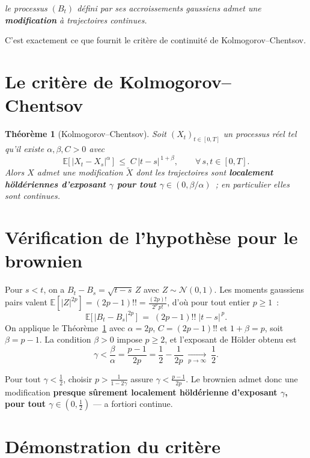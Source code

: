 \documentclass[11pt,a4paper]{article}
\theoremstyle{plain}
\newtheorem{theoreme}{Théorème}
\theoremstyle{definition}
\newcommand{\Esp}{\mathbb{E}}
\newcommand{\Loi}{\mathcal{N}}
\newcommand{\abs}[1]{\left\lvert #1 \right\rvert}
\begin{document}
\begin{center}
\itshape le processus $(B_t)$ d\'efini par ses accroissements gaussiens admet une \textbf{modification} \`a trajectoires continues.
\end{center}

C'est exactement ce que fournit le crit\`ere de continuit\'e de Kolmogorov--Chentsov.

\section{Le crit\`ere de Kolmogorov--Chentsov}

\begin{theoreme}[Kolmogorov--Chentsov]\label{th:kc}
Soit $(X_t)_{t\in[0,T]}$ un processus r\'eel tel qu'il existe $\alpha,\beta,C>0$ avec
\[
\Esp\bigl[\,\abs{X_t-X_s}^{\alpha}\,\bigr]\;\le\;C\,\abs{t-s}^{\,1+\beta},\qquad\forall\,s,t\in[0,T].
\]
Alors $X$ admet une modification $\tilde X$ dont les trajectoires sont \textbf{localement h\"old\'eriennes d'exposant $\gamma$ pour tout $\gamma\in(0,\beta/\alpha)$}~; en particulier elles sont continues.
\end{theoreme}

\section{V\'erification de l'hypoth\`ese pour le brownien}

Pour $s<t$, on a $B_t-B_s=\sqrt{t-s}\,Z$ avec $Z\sim\Loi(0,1)$. Les moments gaussiens pairs valent $\Esp[\abs{Z}^{2p}]=(2p-1)!!=\tfrac{(2p)!}{2^p\,p!}$, d'o\`u pour tout entier $p\ge1$~:
\[
\Esp\bigl[\,\abs{B_t-B_s}^{2p}\,\bigr]\;=\;(2p-1)!!\;\abs{t-s}^{\,p}.
\]
On applique le Th\'eor\`eme~\ref{th:kc} avec $\alpha=2p$, $C=(2p-1)!!$ et $1+\beta=p$, soit $\beta=p-1$. La condition $\beta>0$ impose $p\ge 2$, et l'exposant de H\"older obtenu est
\[
\gamma<\frac{\beta}{\alpha}=\frac{p-1}{2p}=\frac12-\frac{1}{2p}\;\xrightarrow[p\to\infty]{}\;\frac12 .
\]

\begin{resultat}
Pour tout $\gamma<\tfrac12$, choisir $p>\tfrac{1}{1-2\gamma}$ assure $\gamma<\tfrac{p-1}{2p}$. Le brownien admet donc une modification \textbf{presque s\^urement localement h\"old\'erienne d'exposant $\gamma$, pour tout $\gamma\in(0,\tfrac12)$} --- a fortiori continue.
\end{resultat}

\section{D\'emonstration du crit\`ere}
\end{document}
